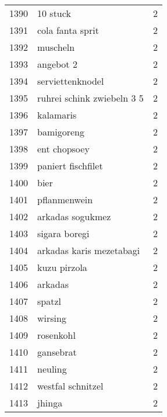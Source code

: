 \begin{tabular}{llr}
1390 &                                           10 stuck &      2 \\
1391 &                                   cola fanta sprit &      2 \\
1392 &                                           muscheln &      2 \\
1393 &                                          angebot 2 &      2 \\
1394 &                                   serviettenknodel &      2 \\
1395 &                         ruhrei schink zwiebeln 3 5 &      2 \\
1396 &                                          kalamaris &      2 \\
1397 &                                         bamigoreng &      2 \\
1398 &                                       ent chopsoey &      2 \\
1399 &                                 paniert fischfilet &      2 \\
1400 &                                               bier &      2 \\
1401 &                                       pflanmenwein &      2 \\
1402 &                                   arkadas sogukmez &      2 \\
1403 &                                      sigara boregi &      2 \\
1404 &                           arkadas karis mezetabagi &      2 \\
1405 &                                       kuzu pirzola &      2 \\
1406 &                                            arkadas &      2 \\
1407 &                                             spatzl &      2 \\
1408 &                                            wirsing &      2 \\
1409 &                                          rosenkohl &      2 \\
1410 &                                          gansebrat &      2 \\
1411 &                                            neuling &      2 \\
1412 &                                  westfal schnitzel &      2 \\
1413 &                                             jhinga &      2 \\

\end{tabular}
